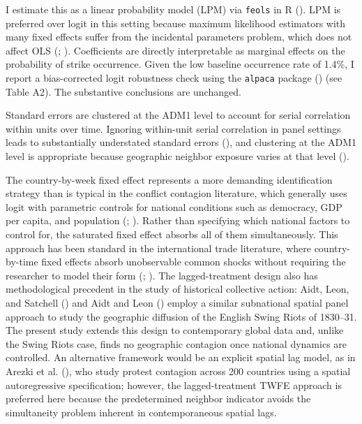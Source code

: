 \documentclass[
  11pt,
]{article}
\begin{document}
I estimate this as a linear probability model (LPM) via \texttt{feols}
in R (). LPM is preferred over logit
in this setting because maximum likelihood estimators with many fixed
effects suffer from the incidental parameters problem, which does not
affect OLS (;
). Coefficients are
directly interpretable as marginal effects on the probability of strike
occurrence. Given the low baseline occurrence rate of 1.4\%, I report a
bias-corrected logit robustness check using the \texttt{alpaca} package
() (see
Table A2). The substantive conclusions are unchanged.

Standard errors are clustered at the ADM1 level to account for serial
correlation within units over time. Ignoring within-unit serial
correlation in panel settings leads to substantially understated
standard errors (), and clustering at the ADM1 level is appropriate
because geographic neighbor exposure varies at that level
().

The country-by-week fixed effect represents a more demanding
identification strategy than is typical in the conflict contagion
literature, which generally uses logit with parametric controls for
national conditions such as democracy, GDP per capita, and population
(;
).
Rather than specifying which national factors to control for, the
saturated fixed effect absorbs all of them simultaneously. This approach
has been standard in the international trade literature, where
country-by-time fixed effects absorb unobservable common shocks without
requiring the researcher to model their form
(;
). The lagged-treatment
design also has methodological precedent in the study of historical
collective action: Aidt, Leon, and Satchell
() and Aidt and Leon
() employ a similar subnational spatial
panel approach to study the geographic diffusion of the English Swing
Riots of 1830--31. The present study extends this design to contemporary
global data and, unlike the Swing Riots case, finds no geographic
contagion once national dynamics are controlled. An alternative
framework would be an explicit spatial lag model, as in Arezki et al.
(), who study protest contagion across
200 countries using a spatial autoregressive specification; however, the
lagged-treatment TWFE approach is preferred here because the
predetermined neighbor indicator avoids the simultaneity problem
inherent in contemporaneous spatial lags.
\end{document}
